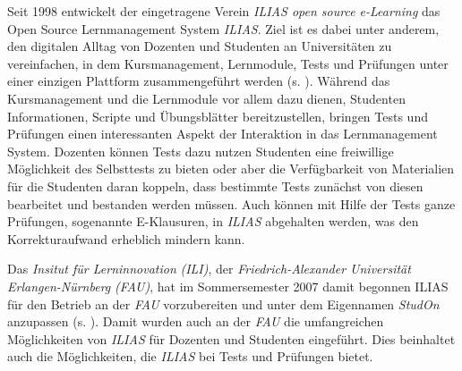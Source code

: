 Seit 1998 entwickelt der eingetragene Verein \textit{ILIAS open source e-Learning} das Open Source Lernmanagement System \textit{ILIAS}. Ziel ist es dabei unter anderem, den digitalen Alltag von Dozenten und Studenten an Universitäten zu vereinfachen, in dem Kursmanagement, Lernmodule, Tests und Prüfungen unter einer einzigen Plattform zusammengeführt werden (s. \cite{Ilias1998}). Während das Kursmanagement und die Lernmodule vor allem dazu dienen, Studenten Informationen, Scripte und Übungsblätter bereitzustellen, bringen Tests und Prüfungen einen interessanten Aspekt der Interaktion in das Lernmanagement System. Dozenten können Tests dazu nutzen Studenten eine freiwillige Möglichkeit des Selbsttests zu bieten oder aber die Verfügbarkeit von Materialien für die Studenten daran koppeln, dass bestimmte Tests zunächst von diesen bearbeitet und bestanden werden müssen. Auch können mit Hilfe der Tests ganze Prüfungen, sogenannte E-Klausuren, in \textit{ILIAS} abgehalten werden, was den Korrekturaufwand erheblich mindern kann.

Das \textit{Insitut für Lerninnovation} \textit{(ILI)}, der \textit{Friedrich-Alexander Universität Erlangen-Nürnberg} \textit{(FAU)}, hat im Sommersemester 2007 damit begonnen ILIAS für den Betrieb an der \textit{FAU} vorzubereiten und unter dem Eigennamen \textit{StudOn} anzupassen (s. \cite{Studon2007}). Damit wurden auch an der \textit{FAU} die umfangreichen Möglichkeiten von \textit{ILIAS} für Dozenten und Studenten eingeführt. Dies beinhaltet auch die Möglichkeiten, die \textit{ILIAS} bei Tests und Prüfungen bietet. 

